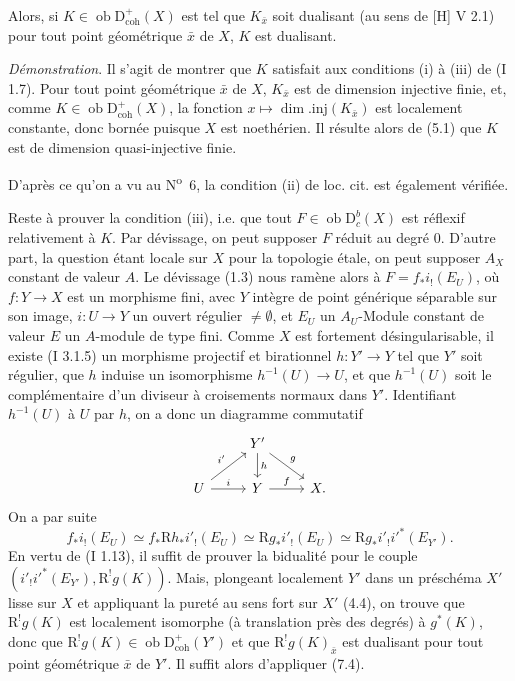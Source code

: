 \documentclass[11pt]{article}
\newcommand{\R}{\mathrm{R}}\newcommand{\RHomCore}{\mathrm{RHom}}
\newcommand{\D}{\mathrm{D}}
\newcommand{\ob}{\operatorname{ob}}
\providecommand{\ob}{\operatorname{ob}}
\providecommand{\R}{\mathrm R}
\begin{document}
Alors, si $K\in\ob\D^{+}_{\mathrm{coh}}(X)$ est tel que $K_{\bar{x}}$ soit dualisant (au sens de [H] V 2.1) pour tout point géométrique $\bar{x}$ de $X$, $K$ est dualisant.

\emph{Démonstration}. Il s'agit de montrer que $K$ satisfait aux conditions (i) à (iii) de (I 1.7). Pour tout point géométrique $\bar{x}$ de $X$, $K_{\bar{x}}$ est de
dimension injective finie, et, comme $K\in\ob\D^{+}_{\mathrm{coh}}(X)$, la fonction $x\mapsto \dim.\mathrm{inj}(K_{\bar{x}})$ est localement constante, donc bornée puisque $X$ est noethérien. Il résulte alors de (5.1) que $K$ est de dimension quasi-injective finie.

D'après ce qu'on a vu au N\textsuperscript{o}~6, la condition (ii) de loc. cit. est également vérifiée.

Reste à prouver la condition (iii), i.e. que tout $F\in\ob\D_c^b(X)$ est réflexif relativement à $K$. Par dévissage, on peut supposer $F$ réduit au degré $0$. D'autre part, la question étant locale sur $X$ pour la topologie étale, on peut supposer $A_X$ constant de valeur $A$. Le dévissage (1.3) nous ramène alors à $F=f_*i_!(E_U)$, où $f:Y\to X$ est un morphisme fini, avec $Y$ intègre de point générique séparable sur son image, $i:U\to Y$ un ouvert régulier $\neq\emptyset$, et $E_U$ un $A_U$-Module constant de valeur $E$ un $A$-module de type fini. Comme $X$ est fortement désingularisable, il existe (I 3.1.5) un morphisme projectif et birationnel $h:Y'\to Y$ tel que $Y'$ soit régulier, que $h$ induise un isomorphisme $h^{-1}(U)\to U$, et que $h^{-1}(U)$ soit le complémentaire d'un diviseur à croisements normaux dans $Y'$. Identifiant $h^{-1}(U)$ à $U$ par $h$, on a donc un diagramme commutatif
\[
\begin{tikzcd}
& Y' \arrow[d,"h"] \arrow[dr,"g"] & \\
U \arrow[ur,"i'"] \arrow[r,"i"] & Y \arrow[r,"f"] & X.
\end{tikzcd}
\]
On a par suite
\[
        f_*i_!(E_U)\simeq f_*\R h_* i'_!(E_U)\simeq \R g_* i'_!(E_U)\simeq \R g_* i'_! i'^*(E_{Y'}).
\]
En vertu de (I 1.13), il suffit de prouver la bidualité pour le couple 
$(i'_!i'^*(E_{Y'}),\R^!g(K))$. Mais, plongeant localement $Y'$ dans un préschéma $X'$
lisse sur $X$ et appliquant la pureté au sens fort sur $X'$ (4.4), on trouve que $\R^!g(K)$ est localement isomorphe (à translation près des degrés) à $g^*(K)$, donc que $\R^!g(K)\in\ob\D^{+}_{\mathrm{coh}}(Y')$ et que $\R^!g(K)_{\bar{x}}$ est dualisant pour tout point géométrique $\bar{x}$ de $Y'$. Il suffit alors d'appliquer (7.4).
\end{document}
